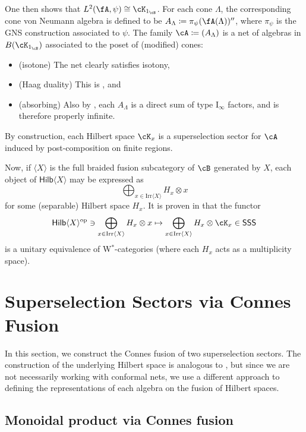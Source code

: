 \documentclass[11pt,reqno]{amsart}
\newcommand{\SSS}{\mathsf{SSS}}
\numberwithin{equation}{section}
\theoremstyle{plain}
\theoremstyle{definition}
\begin{document}
One then shows that $L^2(\fA, \psi)\cong \cK_{1_{\cB}}$. 
For each cone $\Lambda$, the corresponding cone von Neumann algebra is defined to be $A_\Lambda\coloneq \pi_\psi(\fA(\Lambda))''$, where $\pi_\psi$ is the GNS construction associated to $\psi$. The family $\cA\coloneq (A_\Lambda)$ is a net of algebras in $B(\cK_{1_{\cB}})$ associated to the poset of (modified) cones:
\begin{itemize}
    \item (isotone) The net clearly satisfies isotony,
    \item (Haag duality) This is \cite[Theorem~4.7]{2506.19969}, and
    \item (absorbing) Also by \cite[Theorem~4.7]{2506.19969}, each $A_\Lambda$ is a direct sum of type I$_\infty$ factors, and is therefore properly infinite.
\end{itemize}
By construction, each Hilbert space $\cK_x$ is a superselection sector for $\cA$ induced by post-composition on finite regions.
\par Now, if $\langle X \rangle$ is the full braided fusion subcategory of $\cB$ generated by $X$, each object of $\mathsf{Hilb}\langle X \rangle$ may be expressed as 
$$\bigoplus_{x \in \text{Irr}\langle X \rangle} H_x \otimes x$$
for some (separable) Hilbert space $H_x$. It is proven in \cite[Theorem~4.8]{2506.19969} that the functor
\begin{equation}
\label{eq:EquivalenceForBraidedNet}
\mathsf{Hilb}\langle X \rangle^{\text{op}} \ni\bigoplus _{x \in \text{Irr}\langle X \rangle} H_x \otimes x \mapsto \bigoplus_{x \in \text{Irr}\langle X \rangle}H_x \otimes \cK_x\in \SSS
\end{equation}
is a unitary equivalence of W$^*$-categories (where each $H_x$ acts as a multiplicity space).


\section{Superselection Sectors via Connes Fusion}\label{sec:connesfusion}

In this section, we construct the Connes fusion of two superselection sectors. The construction of the underlying Hilbert space is analogous to \cite{MR4239831}, but since we are not necessarily working with conformal nets, we use a different approach to defining the representations of each algebra on the fusion of Hilbert spaces.
\subsection{Monoidal product via Connes fusion}
\end{document}
